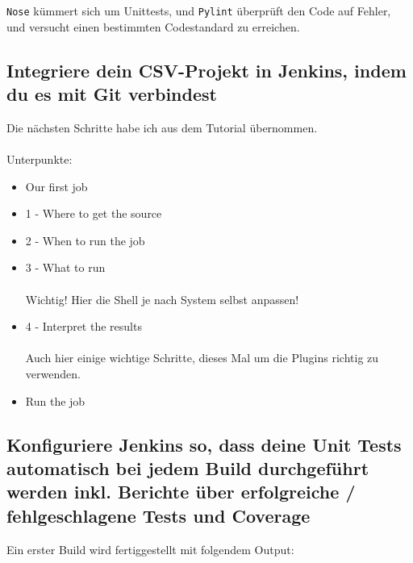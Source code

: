 \documentclass[letterpaper, 12pt]{article}
\let\tempsubsection\subsection
\renewcommand\subsection[1]{\vspace{0cm}\tempsubsection{#1}\vspace{0cm}}
\begin{document}
\texttt{Nose} kümmert sich um Unittests, und \texttt{Pylint} überprüft den Code auf Fehler, und versucht einen bestimmten Codestandard zu erreichen. \\

\newpage

\subsection{Integriere dein CSV-Projekt in Jenkins, indem du es mit Git verbindest}

Die nächsten Schritte habe ich aus dem Tutorial übernommen. \cite{steveblog} \\ \\
Unterpunkte: 
\begin{itemize}
	\item Our first job
	\item 1 - Where to get the source
	\item 2 - When to run the job
	\item 3 - What to run \\\\
	Wichtig! Hier die Shell je nach System selbst anpassen!
	\item 4 - Interpret the results \\\\
	Auch hier einige wichtige Schritte, dieses Mal um die Plugins richtig zu verwenden.
	\item Run the job
\end{itemize}

\subsection{Konfiguriere Jenkins so, dass deine Unit Tests automatisch bei jedem Build durchgeführt werden inkl. Berichte über erfolgreiche / fehlgeschlagene Tests und Coverage}

Ein erster Build wird fertiggestellt mit folgendem Output:
\end{document}
